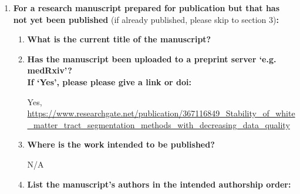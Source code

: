 \documentclass[12pt,phd,a4paper,twoside]{ucl_thesis}
\begin{document}
{\begin{enumerate}[leftmargin=*,label={\bfseries\arabic*.}]
\begin{enumerate}[label={\alph*)}]
	\item \textbf{Where was the work published?}

	\item \textbf{Who published the work?}

	\item \textbf{When was the work published?}

	\item \textbf{List the manuscript's authors in the order they appear on the publication:}

	\item \textbf{Was the work peer reviewd?}

	\item \textbf{Have you retained the copyright?}

	\item \textbf{Was an earlier form of the manuscript uploaded to a preprint server (e.g. medRxiv)? If ‘Yes’, please give a link or doi}
	\\
	If ‘No’, please seek permission from the relevant publisher and check the box next to the below statement:
\begin{itemize}\itemsep0em
\item[$\Box$] {\itshape I acknowledge permission of the publisher named under 1d to include in this thesis portions of the publication named as included in 1c.}
\end{itemize}
\end{enumerate}
\item \textbf{For a research manuscript prepared for publication but that has not yet been published} (if already published, please skip to section 3)\textbf{:}
\begin{enumerate}[label={\alph*)}]\itemsep0em
\item \textbf{What is the current title of the manuscript?}

	\item \textbf{Has the manuscript been uploaded to a preprint server `e.g. medRxiv'?
	\\
	If `Yes', please please give a link or doi:}

	Yes, \url{https://www.researchgate.net/publication/367116849_Stability_of_white_matter_tract_segmentation_methods_with_decreasing_data_quality}
\item \textbf{Where is the work intended to be published?}

	N/A
	\item \textbf{List the manuscript's authors in the intended authorship order:}


\end{enumerate}
\end{enumerate}}
\end{document}
